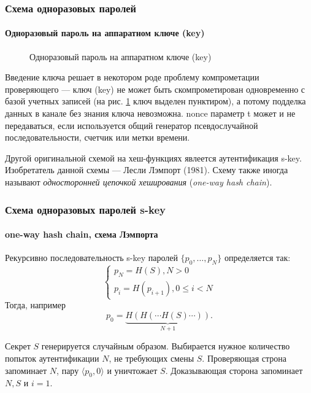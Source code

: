 \begin{frame}
\frametitle{Схема одноразовых паролей}
\framesubtitle{Одноразовый пароль на аппаратном ключе (key)}
\begin{figure}
    \begin{center}
    \end{center}
    \caption{Одноразовый пароль на аппаратном ключе (key)}\label{pict:pwduniqkey}
\end{figure} 
\end{frame}


Введение ключа решает в некотором роде проблему компрометации проверяющего --- ключ (key) не может быть скомпрометирован одновременно с базой учетных записей (на рис. \ref{pict:pwduniqkey} ключ выделен пунктиром), а потому подделка данных в канале без знания ключа невозможна. nonce параметр t может и не передаваться, если используется общий генератор псевдослучайной последовательности, счетчик или метки времени.


Другой оригинальной схемой на хеш-функциях явлеется аутентификация s-key. Изобретатель данной схемы --- Лесли Лэмпорт (1981). Схему также иногда называют \emph{односторонней цепочкой хеширования} (\emph{one-way hash chain}).


\begin{frame}
\frametitle{Схема одноразовых паролей s-key}
\framesubtitle{one-way hash chain, схема Лэмпорта}
Рекурсивно последовательность s-key паролей $\{p_0,\ldots, p_N\}$ определяется так:
    \[
        \begin{cases}
            p_N = H(S), N > 0\\
            p_i = H(p_{i+1}), 0 \leq i < N
        \end{cases}
    \]
Тогда, например
    \[
        p_0 = \underbrace{ H(H(\cdots H(S)\cdots )) } _ {N + 1}.
    \]

\alert{Секрет} $S$ генерируется случайным образом. Выбирается нужное \alert{количество попыток аутентификации} $N$, не требующих смены $S$. Проверяющая строна запоминает $N$, пару $\langle p_0,0\rangle$ и уничтожает $S$. Доказывающая сторона запоминает $N, S$ и $i=1$.
\end{frame}


